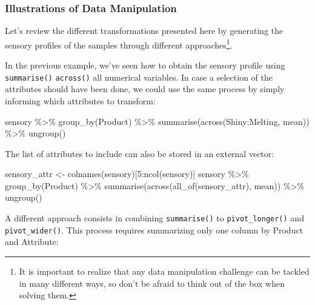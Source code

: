 \documentclass[
]{krantz}
\makeatletter
\newenvironment{Shaded}{\begin{snugshade}}{\end{snugshade}}
\newcommand{\DecValTok}[1]{\textcolor[rgb]{0.06,0.06,0.06}{#1}}
\newcommand{\FunctionTok}[1]{\textcolor[rgb]{0,0,0}{#1}}
\newcommand{\NormalTok}[1]{#1}
\newcommand{\OtherTok}[1]{\textcolor[rgb]{0.37,0.37,0.37}{#1}}
\newcommand{\SpecialCharTok}[1]{\textcolor[rgb]{0,0,0}{#1}}
\newenvironment{kframe}{%
\medskip{}
\setlength{\fboxsep}{.8em}
 \def\at@end@of@kframe{}%
 \ifinner\ifhmode%
  \def\at@end@of@kframe{\end{minipage}}%
  \begin{minipage}{\columnwidth}%
 \fi\fi%
 \def\FrameCommand##1{\hskip\@totalleftmargin \hskip-\fboxsep
 \colorbox{shadecolor}{##1}\hskip-\fboxsep
     \hskip-\linewidth \hskip-\@totalleftmargin \hskip\columnwidth}%
 \MakeFramed {\advance\hsize-\width
   \@totalleftmargin\z@ \linewidth\hsize
   \@setminipage}}%
 {\par\unskip\endMakeFramed%
 \at@end@of@kframe}
\renewenvironment{Shaded}{\begin{kframe}}{\end{kframe}}
\makeatother
\begin{document}
\hypertarget{means}{%
\subsubsection*{Illustrations of Data Manipulation}\label{means}}


Let's review the different transformations presented here by generating the sensory profiles of the samples through different approaches\footnote{It is important to realize that any data manipulation challenge can be tackled in many different ways, so don't be afraid to think out of the box when solving them.}.

In the previous example, we've seen how to obtain the sensory profile using \texttt{summarise()} \texttt{across()} all numerical variables. In case a selection of the attributes should have been done, we could use the same process by simply informing which attributes to transform:

\begin{Shaded}
\begin{Highlighting}[]
\NormalTok{sensory }\SpecialCharTok{\%\textgreater{}\%}
  \FunctionTok{group\_by}\NormalTok{(Product) }\SpecialCharTok{\%\textgreater{}\%}
  \FunctionTok{summarise}\NormalTok{(}\FunctionTok{across}\NormalTok{(Shiny}\SpecialCharTok{:}\NormalTok{Melting, mean)) }\SpecialCharTok{\%\textgreater{}\%}
  \FunctionTok{ungroup}\NormalTok{()}
\end{Highlighting}
\end{Shaded}

The list of attributes to include can also be stored in an external vector:

\begin{Shaded}
\begin{Highlighting}[]
\NormalTok{sensory\_attr }\OtherTok{\textless{}{-}} \FunctionTok{colnames}\NormalTok{(sensory)[}\DecValTok{5}\SpecialCharTok{:}\FunctionTok{ncol}\NormalTok{(sensory)]}
\NormalTok{sensory }\SpecialCharTok{\%\textgreater{}\%}
  \FunctionTok{group\_by}\NormalTok{(Product) }\SpecialCharTok{\%\textgreater{}\%}
  \FunctionTok{summarise}\NormalTok{(}\FunctionTok{across}\NormalTok{(}\FunctionTok{all\_of}\NormalTok{(sensory\_attr), mean)) }\SpecialCharTok{\%\textgreater{}\%}
  \FunctionTok{ungroup}\NormalTok{()}
\end{Highlighting}
\end{Shaded}

A different approach consists in combining \texttt{summarise()} to \texttt{pivot\_longer()} and \texttt{pivot\_wider()}. This process requires summarizing only one column by Product and Attribute:
\end{document}
